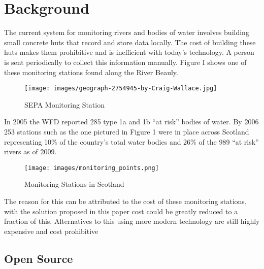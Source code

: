 \section{Background}
The current system for monitoring rivers and bodies of water involves building small concrete huts that record and store data locally. The cost of building these huts makes them prohibitive and is inefficient with today's technology. A person is sent periodically to collect this information manually. Figure I shows one of these monitoring stations found along the River Beauly. 
\begin{figure}[H]
	\centering
	\texttt{[image: images/geograph-2754945-by-Craig-Wallace.jpg]}
	\caption{ SEPA Monitoring Station \citep{Wallace2012}}
	\label{fig:monStation}
\end{figure}
In 2005 the WFD reported 285 type 1a and 1b “at risk” bodies of water. \citep{SEPA2007} By 2006  253 stations such as the one pictured in Figure 1 were in place across Scotland representing 10\% of the country’s total water bodies and 26\% of the 989  “at risk” rivers as of 2009. \citep{SEPA2009}
\begin{figure}[H]
	\centering
	\texttt{[image: images/monitoring\_points.png]}
	\caption{ Monitoring Stations in Scotland \citep{SEPA2006}}
	\label{fig:monStation}
\end{figure}
The reason for this can be attributed to the cost of these monitoring stations, with the solution proposed in this paper cost could be greatly reduced to a fraction of this. \citep{SEPA2016} Alternatives to this using more modern technology are still highly expensive and cost prohibitive \citep{TheIoTMarketplace2015}

\subsection{Open Source}


